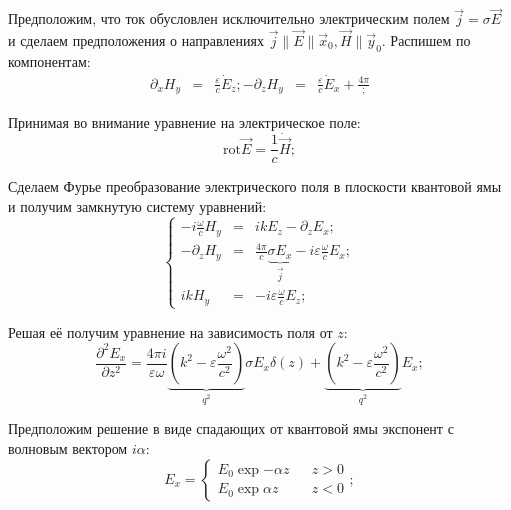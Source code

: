 \documentclass[../main.tex]{subfiles}
\newcommand{\rot}{\text{rot}}
\begin{document}
    Предположим, что ток обусловлен исключительно электрическим полем
    $\vec j  = \sigma \vec E$ и сделаем предположения о направлениях 
    $\vec j \parallel \vec E \parallel \vec{x}_0, \vec H \parallel \vec{y}_0$.
    Распишем по компонентам:
    \begin{equation}
        \begin{aligned}
            \partial_x H_y &=& \frac{\varepsilon}{c} \dot{E}_z;
            -\partial_z H_y &=& \frac{\varepsilon}{c} \dot{E}_x + \frac{4\pi };
        \end{aligned}
    \end{equation}

    Принимая во внимание уравнение на электрическое поле:
    \begin{equation}
        \rot \vec E = \frac{1}{c} \dot \vec H;
    \end{equation}

    Сделаем Фурье преобразование электрического поля в плоскости квантовой ямы
    и получим замкнутую систему уравнений:
    \begin{equation}
        \left\{
        \begin{aligned}
            - i \frac{\omega}{c} H_y &=& i k E_z - \partial_z E_x;\\
            - \partial_z H_y  &=& \frac{4\pi}{c} \underbrace{\sigma E_x}_{\vec j} 
            - i \varepsilon  \frac{\omega}{c} E_x;\\
            ik H_y  &=& - i \varepsilon \frac{\omega}{c} E_z;
        \end{aligned}
        \right.
    \end{equation}

    Решая её получим уравнение на зависимость поля от $z$:
    \begin{equation}
        \frac{\partial^2 E_x}{\partial z^2} = \frac{4\pi i}{\varepsilon \omega}
        \underbrace{\left(k^2  - \varepsilon \frac{\omega^2}{c^2}\right)}_{q^2} \sigma E_x \delta(z)
        + \underbrace{\left(k^2  - \varepsilon \frac{\omega^2}{c^2}\right)}_{q^2} E_x;
    \end{equation}

    Предположим решение в виде спадающих от квантовой ямы экспонент
    с волновым вектором $i\alpha$:
    \begin{equation*}
        E_x = \left\{
            \begin{aligned}
                E_0 \exp{-\alpha z} & &z > 0\\
                E_0 \exp{\alpha z} & &z < 0
            \end{aligned}
        \right.;
    \end{equation*}
\end{document}
